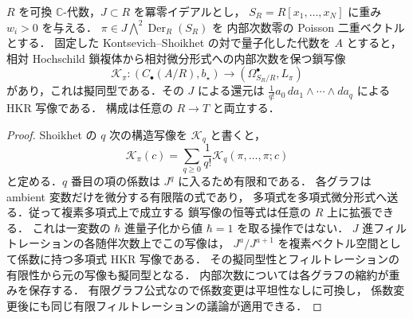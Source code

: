 \begin{lemma}
\label{lem:nilpotent-chain-formality}
$R$ を可換 $\mathbb C$-代数，$J\subset R$ を冪零イデアルとし，
$S_R=R[x_1,\ldots,x_N]$ に重み $w_i>0$ を与える．
$\pi\in J\bigwedge^2\operatorname{Der}_R(S_R)$ を
内部次数零の Poisson 二重ベクトルとする．
固定した Kontsevich--Shoikhet の対で量子化した代数を $A$ とすると，
相対 Hochschild 鎖複体から相対微分形式への内部次数を保つ鎖写像
\[
 \mathcal K_\pi:
 (C_\bullet(A/R),b_\star)
 \longrightarrow(\Omega^\bullet_{S_R/R},L_\pi)
\]
があり，これは擬同型である．その $J$ による還元は
$\frac1{q!}a_0\,da_1\wedge\cdots\wedge da_q$ による HKR 写像である．
構成は任意の $R\to T$ と両立する．
\end{lemma}
\begin{proof}
Shoikhet の $q$ 次の構造写像を $\mathcal K_q$ と書くと，
\[
 \mathcal K_\pi(c)
 =\sum_{q\ge0}\frac1{q!}\mathcal K_q(\pi,\ldots,\pi;c)
\]
と定める．$q$ 番目の項の係数は $J^q$ に入るため有限和である．
各グラフは ambient 変数だけを微分する有限階の式であり，
多項式を多項式微分形式へ送る．従って複素多項式上で成立する
鎖写像の恒等式は任意の $R$ 上に拡張できる．
これは一変数の $\hbar$ 進量子化から値 $\hbar=1$ を取る操作ではない．
$J$ 進フィルトレーションの各随伴次数上でこの写像は，
$J^a/J^{a+1}$ を複素ベクトル空間として係数に持つ多項式 HKR 写像である．
その擬同型性とフィルトレーションの有限性から元の写像も擬同型となる．
内部次数については各グラフの縮約が重みを保存する．
有限グラフ公式なので係数変更は平坦性なしに可換し，
係数変更後にも同じ有限フィルトレーションの議論が適用できる．
\end{proof}

